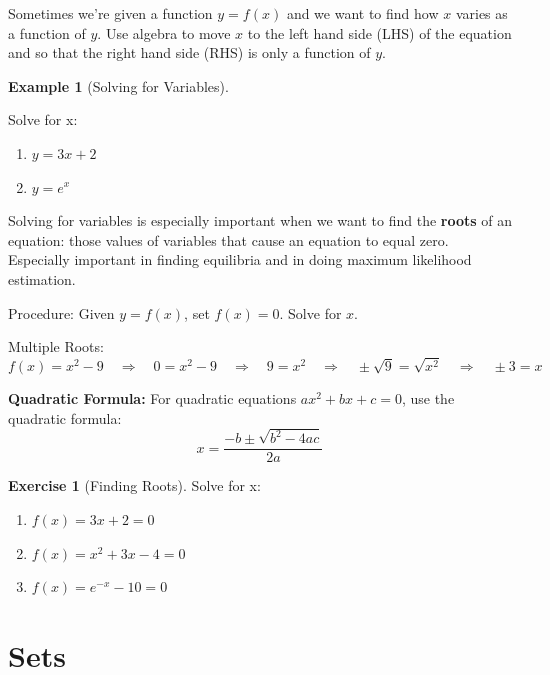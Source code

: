 \documentclass[]{book}
\theoremstyle{definition}
\theoremstyle{definition}
\newtheorem{example}{Example}[chapter]
\theoremstyle{definition}
\newtheorem{exercise}{Exercise}[chapter]
\theoremstyle{remark}
\begin{document}
Sometimes we're given a function \(y=f(x)\) and we want to find how \(x\) varies as a function of \(y\). Use algebra to move \(x\) to the left hand side (LHS) of the equation and so that the right hand side (RHS) is only a function of \(y\).

\begin{example}[Solving for Variables]
\protect\hypertarget{exm:solvevar}{}{\label{exm:solvevar} {} }

Solve for x:

\begin{enumerate}
\def\labelenumi{\arabic{enumi}.}
\item
  \(y=3x+2\)
\item
  \(y=e^x\)
\end{enumerate}
\end{example}

Solving for variables is especially important when we want to find the \textbf{roots} of an equation: those values of variables that cause an equation to equal zero. Especially important in finding equilibria and in doing maximum likelihood estimation.

Procedure: Given \(y=f(x)\), set \(f(x)=0\). Solve for \(x\).

Multiple Roots:
\[f(x)=x^2 - 9 \quad\Longrightarrow\quad 0=x^2 - 9 \quad\Longrightarrow\quad 9=x^2 \quad\Longrightarrow\quad \pm \sqrt{9}=\sqrt{x^2} \quad\Longrightarrow\quad \pm 3=x\]

\textbf{Quadratic Formula:} For quadratic equations \(ax^2+bx+c=0\), use the quadratic formula: \[x=\frac{-b\pm\sqrt{b^2-4ac}}{2a}\]

\begin{exercise}[Finding Roots]
\protect\hypertarget{exr:solvevar1}{}{\label{exr:solvevar1} {} }
Solve for x:

\begin{enumerate}
\def\labelenumi{\arabic{enumi}.}
\item
  \(f(x)=3x+2 = 0\)
\item
  \(f(x)=x^2+3x-4=0\)
\item
  \(f(x)=e^{-x}-10 = 0\)
\end{enumerate}
\end{exercise}

\hypertarget{sets}{%
\section{Sets}\label{sets}}
\end{document}
